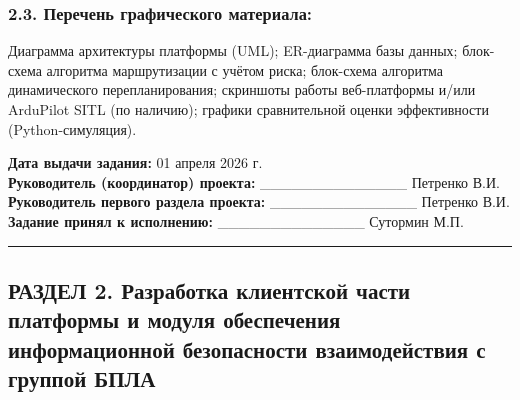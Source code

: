 \hypertarget{ux43fux435ux440ux435ux447ux435ux43dux44c-ux433ux440ux430ux444ux438ux447ux435ux441ux43aux43eux433ux43e-ux43cux430ux442ux435ux440ux438ux430ux43bux430}{%
\subsubsection{2.3. Перечень графического материала:}\label{ux43fux435ux440ux435ux447ux435ux43dux44c-ux433ux440ux430ux444ux438ux447ux435ux441ux43aux43eux433ux43e-ux43cux430ux442ux435ux440ux438ux430ux43bux430}}

Диаграмма архитектуры платформы (UML); ER-диаграмма базы данных; блок-схема алгоритма маршрутизации с учётом риска; блок-схема алгоритма динамического перепланирования; скриншоты работы веб-платформы и/или ArduPilot SITL (по наличию); графики сравнительной оценки эффективности (Python-симуляция).

\textbf{Дата выдачи задания:} 01 апреля 2026 г.\\
\textbf{Руководитель (координатор) проекта:} \_\_\_\_\_\_\_\_\_\_\_\_\_\_ Петренко В.И.\\
\textbf{Руководитель первого раздела проекта:} \_\_\_\_\_\_\_\_\_\_\_\_\_\_ Петренко В.И.\\
\textbf{Задание принял к исполнению:} \_\_\_\_\_\_\_\_\_\_\_\_\_\_ Сутормин М.П.

\begin{center}\rule{0.5\linewidth}{0.5pt}\end{center}

\hypertarget{ux440ux430ux437ux434ux435ux43b-2.-ux440ux430ux437ux440ux430ux431ux43eux442ux43aux430-ux43aux43bux438ux435ux43dux442ux441ux43aux43eux439-ux447ux430ux441ux442ux438-ux43fux43bux430ux442ux444ux43eux440ux43cux44b-ux438-ux43cux43eux434ux443ux43bux44f-ux43eux431ux435ux441ux43fux435ux447ux435ux43dux438ux44f-ux438ux43dux444ux43eux440ux43cux430ux446ux438ux43eux43dux43dux43eux439-ux431ux435ux437ux43eux43fux430ux441ux43dux43eux441ux442ux438-ux432ux437ux430ux438ux43cux43eux434ux435ux439ux441ux442ux432ux438ux44f-ux441-ux433ux440ux443ux43fux43fux43eux439-ux431ux43fux43bux430}{%
\subsection{РАЗДЕЛ 2. Разработка клиентской части платформы и модуля обеспечения информационной безопасности взаимодействия с группой БПЛА}\label{ux440ux430ux437ux434ux435ux43b-2.-ux440ux430ux437ux440ux430ux431ux43eux442ux43aux430-ux43aux43bux438ux435ux43dux442ux441ux43aux43eux439-ux447ux430ux441ux442ux438-ux43fux43bux430ux442ux444ux43eux440ux43cux44b-ux438-ux43cux43eux434ux443ux43bux44f-ux43eux431ux435ux441ux43fux435ux447ux435ux43dux438ux44f-ux438ux43dux444ux43eux440ux43cux430ux446ux438ux43eux43dux43dux43eux439-ux431ux435ux437ux43eux43fux430ux441ux43dux43eux441ux442ux438-ux432ux437ux430ux438ux43cux43eux434ux435ux439ux441ux442ux432ux438ux44f-ux441-ux433ux440ux443ux43fux43fux43eux439-ux431ux43fux43bux430}}

